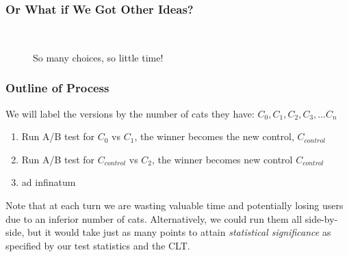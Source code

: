 \documentclass[]{beamer}
\theoremstyle{definition}
\begin{document}
\begin{frame}
\frametitle{Or What if We Got Other Ideas?}
\begin{figure}[ht!] 
\centering
{}\pause
{}\pause\\
\pause
{}
\caption{So many choices, so little time!}
\end{figure}
\end{frame}

\begin{frame}
\frametitle{Outline of Process}
We will label the versions by the number of cats they have: $C_0, C_1, C_2, C_3, \ldots C_n$
\begin{enumerate}[<+->]
\item  Run A/B test for $C_0$ vs $C_1$, the winner becomes the new control, $C_{control}$
\item Run A/B test for $C_{control}$ vs $C_2$, the winner becomes new control $C_{control}$
\item ad infinatum
\end{enumerate}
Note that at each turn we are wasting valuable time and potentially losing users due to an inferior number of cats.  Alternatively, we could run them all side-by-side, but it would take just as many points to attain \emph{statistical significance} as specified by our test statistics and the CLT.
\end{frame}
\end{document}
